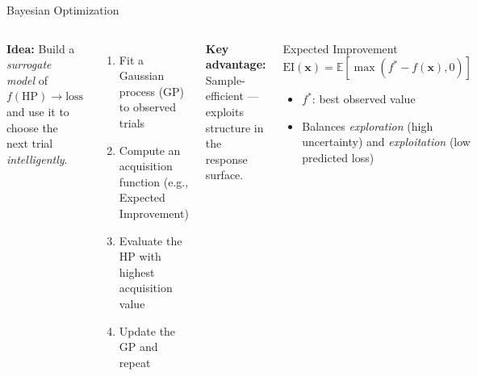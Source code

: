 \documentclass[aspectratio=169,11pt]{beamer}
\newcommand{\emphc}[1]{\textcolor{harvardcrimson}{#1}}
\newcommand{\x}{\bm{x}}
\newcommand{\E}[1]{\mathbb{E}\!\left[#1\right]}
\begin{document}
\begin{frame}{Bayesian Optimization}
\begin{columns}[T]
\textbf{Idea:} Build a \emph{surrogate model} of $f(\text{HP}) \to \text{loss}$ and use it to choose the next trial \emph{intelligently}.

\vspace{0.3cm}
\begin{enumerate}
    \item Fit a Gaussian process (GP) to observed trials
    \item Compute an \emphc{acquisition function} (e.g., Expected Improvement)
    \item Evaluate the HP with highest acquisition value
    \item Update the GP and repeat
\end{enumerate}

\vspace{0.3cm}
\textbf{Key advantage:} \emphc{Sample-efficient} --- exploits structure in the response surface.

\begin{block}{Expected Improvement}
\vspace{-0.2cm}
\[
    \text{EI}(\x) = \E{\max(f^* - f(\x), 0)}
\]
\vspace{-0.2cm}
\begin{itemize}
    \item $f^*$: best observed value
    \item Balances \emph{exploration} (high uncertainty) and \emph{exploitation} (low predicted loss)
\end{itemize}
\end{block}
\end{columns}
\end{frame}
\end{document}
